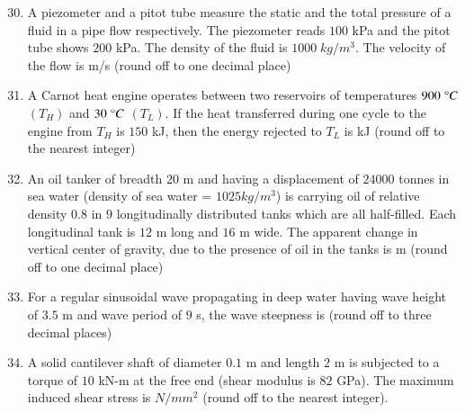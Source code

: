 \documentclass[journal]{IEEEtran}
\theoremstyle{remark}
\begin{document}
\newpage
\vspace*{0.25cm}
\begin{enumerate}[itemsep=1em]
\setcounter{enumi}{29}
\item A piezometer and a pitot tube measure the static and the total pressure of a fluid in a pipe flow respectively. The piezometer reads $100$ kPa and the pitot tube shows $200$ kPa. The density of the fluid is $1000\; kg/m^3$. The velocity of the flow is \underline{\hspace{1cm}} m/s (round off to one decimal place)  
\end{enumerate}

\begin{enumerate}[itemsep=1em]
\setcounter{enumi}{30}
\item A Carnot heat engine operates between two reservoirs of temperatures $900\;\degree C$ $(T_H)$ and $30\;\degree C$ $(T_L)$. If the heat transferred during one cycle to the engine from $T_H$ is $150$ kJ, then the energy rejected to $T_L$ is \underline{\hspace{1cm}} kJ (round off to the nearest integer) 
    
\end{enumerate}

\begin{enumerate}[itemsep=1em]
\setcounter{enumi}{31}
\item An oil tanker of breadth $20$ m and having a displacement of $24000$ tonnes in sea water (density of sea water = $1025 kg/m^3$) is carrying oil of relative density $0.8$ in $9$ longitudinally distributed tanks which are all half-filled. Each longitudinal tank is $12$ m long and $16$ m wide. The apparent change in vertical center of gravity, due to the presence of oil in the tanks is \underline{\hspace{1cm}} m (round off to one decimal place) 
\end{enumerate}

\begin{enumerate}[itemsep=1em]
\setcounter{enumi}{32}
\item For a regular sinusoidal wave propagating in deep water having wave height of $3.5$ m and wave period of $9$ s, the wave steepness is \underline{\hspace{1cm}} (round off to three decimal places)   
\end{enumerate}

\begin{enumerate}[itemsep=1em]
\setcounter{enumi}{33}
\item A solid cantilever shaft of diameter $0.1$ m and length $2$ m is subjected to a torque of $1$0 kN-m at the free end (shear modulus is $82$ GPa). The maximum induced shear stress is \underline{\hspace{1cm}} $N/mm^2$ (round off to the nearest integer). 
\end{enumerate}
\end{document}
